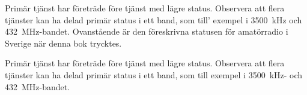 Primär tjänst har företräde före tjänst med lägre status.
Observera att flera tjänster kan ha delad primär status i ett band, som till'
exempel i 3500~kHz och 432~MHz-bandet.
Ovanstående är den föreskrivna statusen för amatörradio i Sverige när
denna bok trycktes.

Primär tjänst har företräde före tjänst med lägre status.
Observera att flera tjänster kan ha delad primär status i ett band,
som till exempel i 3500~kHz- och 432~MHz-bandet.
